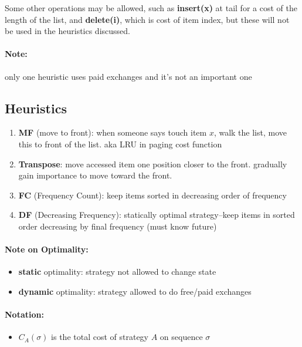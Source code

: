 \documentclass[11pt]{article}
\begin{document}
Some other operations may be allowed, such as {\bf insert(x)} at tail for a cost of the length of the list, and {\bf delete(i)}, which is cost of item index, but these will not be used in the heuristics discussed.

\paragraph{Note:} only one heuristic uses paid exchanges and it's not an important one

\subsection{Heuristics}

\begin{enumerate}
	\item {\bf MF} (move to front): when someone says touch item $x$, walk the list, move this to front of the list. aka LRU in paging cost function
	\item {\bf Transpose}: move accessed item one position closer to the front. gradually gain importance to move toward the front.
	\item {\bf FC} (Frequency Count): keep items sorted in decreasing order of frequency
	\item {\bf DF} (Decreasing Frequency): statically optimal strategy--keep items in sorted order decreasing by final frequency (must know future)
\end{enumerate}


\paragraph{Note on Optimality:}
\begin{itemize}
	\item {\bf static} optimality: strategy not allowed to change state
	\item {\bf dynamic} optimality: strategy allowed to do free/paid exchanges
\end{itemize}

\paragraph{Notation:}
\begin{itemize}
	\item $C_A(\sigma)$ is the total cost of strategy $A$ on sequence $\sigma$
\end{itemize}
\end{document}

